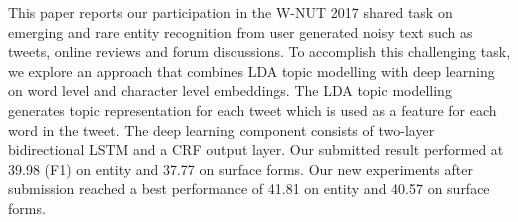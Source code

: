 This paper reports our participation in the W-NUT 2017 shared task on emerging and rare entity recognition from user generated noisy text such as tweets, online reviews and forum discussions. To accomplish this challenging task, we explore an approach that combines LDA topic modelling with deep learning on word level and character level embeddings. The LDA topic modelling generates topic representation for each tweet which is used as a feature for each word in the tweet. The deep learning component consists of two-layer bidirectional LSTM and a CRF output layer. Our submitted result performed at 39.98 (F1) on entity and 37.77 on surface forms. Our new experiments after submission reached a best performance of 41.81 on entity and 40.57 on surface forms.
